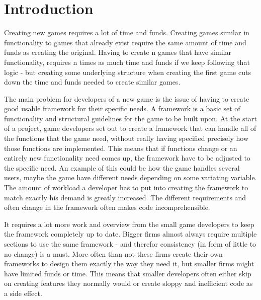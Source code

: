 \chapter{Introduction}
\label{chap:intro}





Creating new games requires a lot of time and funds. Creating games similar in functionality to games that already exist require the same amount of time and funds as creating the original. Having to create n games that have similar functionality, requires n times as much time and funds if we keep following that logic - but creating some underlying structure when creating the first game cuts down the time and funds needed to create similar games.

The main problem for developers of a new game is the issue of having to create good usable framework for their specific needs. A framework is a basic set of functionality and structural guidelines for the game to be built upon. At the start of a project, game developers set out to create a framework that can handle all of the functions that the game need, without really having specified precisely how those functions are implemented. This means that if functions change or an entirely new functionality need comes up, the framework have to be adjusted to the specific need. An example of this could be how the game handles several users, maybe the game have different needs depending on some variating variable. The amount of workload a developer has to put into creating the framework to match exactly his demand is greatly increased. The different requirements and often change in the framework often makes code incomprehensible.

It requires a lot more work and overview from the small game developers to keep the framework completely up to date. Bigger firms almost always require multiple sections to use the same framework - and therefor consistency (in form of little to no change) is a must. More often than not these firms create their own frameworks to design them exactly the way they need it, but smaller firms might have limited funds or time. This means that smaller developers often either skip on creating features they normally would or create sloppy and inefficient code as a side effect.

